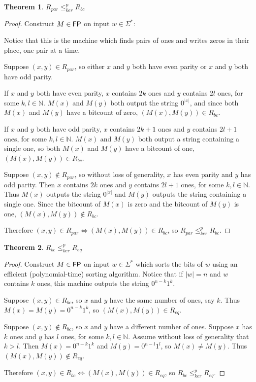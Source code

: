 \documentclass[draft]{article}
\newtheorem{theorem}{Theorem}%
\theoremstyle{definition}
\newcommand{\sigmastar}{\Sigma^{*}}
\newcommand{\kr}{\leq^{p}_{ker}} %
\begin{document}
\begin{theorem}$R_{par}\kr R_{bc}$\end{theorem}
\begin{proof}
  Construct $M\in {\ensuremath{\mathsf{FP}}}$ on input $w\in\sigmastar$:\\
  \begin{algorithm}[H]
  \end{algorithm}
  Notice that this is the machine which finds pairs of ones and writes zeros in
  their place, one pair at a time.

  Suppose $(x, y)\in R_{par}$, so either $x$ and $y$ both have even parity or
  $x$ and $y$ both have odd parity.
  
  If $x$ and $y$ both have even parity, $x$ contains $2k$ ones and $y$ contains
  $2l$ ones, for some $k,l\in\mathbb{N}$. $M(x)$ and $M(y)$ both output the
  string $0^{|x|}$, and since both $M(x)$ and $M(y)$ have a bitcount of zero,
  $(M(x), M(y))\in R_{bc}$.

  If $x$ and $y$ both have odd parity, $x$ contains $2k+1$ ones and $y$
  contains $2l+1$ ones, for some $k,l\in\mathbb{N}$. $M(x)$ and $M(y)$ both
  output a string containing a single one, so both $M(x)$ and $M(y)$ have a
  bitcount of one, $(M(x), M(y))\in R_{bc}$.

  Suppose $(x, y)\notin R_{par}$, so without loss of generality, $x$ has even
  parity and $y$ has odd parity. Then $x$ contains $2k$ ones and $y$ contains
  $2l+1$ ones, for some $k,l\in\mathbb{N}$. Thus $M(x)$ outputs the string
  $0^{|x|}$ and $M(y)$ outputs the string containing a single one. Since the
  bitcount of $M(x)$ is zero and the bitcount of $M(y)$ is one,
  $(M(x), M(y))\notin R_{bc}$.

  Therefore $(x, y)\in R_{par} \iff (M(x), M(y))\in R_{bc}$, so
  $R_{par} \kr R_{bc}$.
\end{proof}

\begin{theorem}$R_{bc}\kr R_{eq}$\end{theorem}
\begin{proof}
  Construct $M\in {\ensuremath{\mathsf{FP}}}$ on input $w\in\sigmastar$ which sorts the bits of $w$
  using an efficient (polynomial-time) sorting algorithm. Notice that if
  $|w|=n$ and $w$ contains $k$ ones, this machine outputs the string
  $0^{n-k}1^k$.

  Suppose $(x, y)\in R_{bc}$, so $x$ and $y$ have the same number of ones, say
  $k$. Thus $M(x)=M(y)=0^{n-k}1^k$, so $(M(x), M(y))\in R_{eq}$.
  
  Suppose $(x, y)\notin R_{bc}$, so $x$ and $y$ have a different number of
  ones. Suppose $x$ has $k$ ones and $y$ has $l$ ones, for some
  $k,l\in\mathbb{N}$. Assume without loss of generality that $k>l$. Then
  $M(x)=0^{n-k}1^{k}$ and $M(y)=0^{n-l}1^{l}$, so $M(x)\neq M(y)$. Thus
  $(M(x), M(y))\notin R_{eq}$.

  Therefore $(x, y)\in R_{bc} \iff (M(x), M(y))\in R_{eq}$, so $R_{bc}\kr
  R_{eq}$.
\end{proof}
\end{document}
